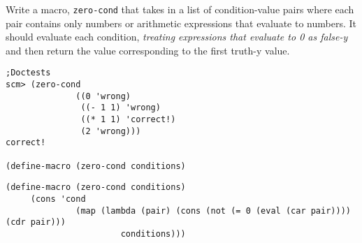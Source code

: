 \question Write a macro, \texttt{zero-cond} that takes in a list of condition-value pairs where each pair contains only numbers or arithmetic expressions that evaluate to numbers. It should evaluate each condition, \emph{treating expressions that evaluate to 0 as false-y} and then return the value corresponding to the first truth-y value.

\begin{lstlisting}
;Doctests
scm> (zero-cond
              ((0 'wrong)
               ((- 1 1) 'wrong)
               ((* 1 1) 'correct!)
               (2 'wrong)))
correct!

(define-macro (zero-cond conditions)
\end{lstlisting}
\begin{solution}
\begin{lstlisting}
(define-macro (zero-cond conditions)
     (cons 'cond 
              (map (lambda (pair) (cons (not (= 0 (eval (car pair)))) (cdr pair))) 
                       conditions)))
\end{lstlisting}
\end{solution}